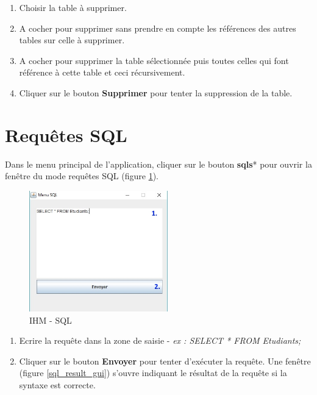 \begin{enumerate}
\item Choisir la table à supprimer.
\item A cocher pour supprimer sans prendre en compte les références des autres tables sur celle à supprimer.
\item A cocher pour supprimer la table sélectionnée puis toutes celles qui font référence à cette table et ceci récursivement.
\item Cliquer sur le bouton \textbf{Supprimer} pour tenter la suppression de la table.
\end{enumerate}

\section{Requ\^etes SQL}
Dans le menu principal de l'application, cliquer sur le bouton \textbf{\glspl{sql}}* pour ouvrir la fen\^etre du mode requ\^etes SQL (figure \ref{sql_gui}).
\begin{figure}[!h]
\centering
\includegraphics[width=6cm]{./images/manuel/sql.jpg}
\caption{IHM - SQL}
\label{sql_gui}
\end{figure}

\begin{enumerate}
\item Ecrire la requ\^ete dans la zone de saisie - \textit{ex : SELECT * FROM Etudiants;} 
\item Cliquer sur le bouton \textbf{Envoyer} pour tenter d'exécuter la requ\^ete.
Une fenêtre (figure \ref{sql_result_gui}) s'ouvre indiquant le résultat de la requ\^ete si la syntaxe est correcte.
\end{enumerate}

